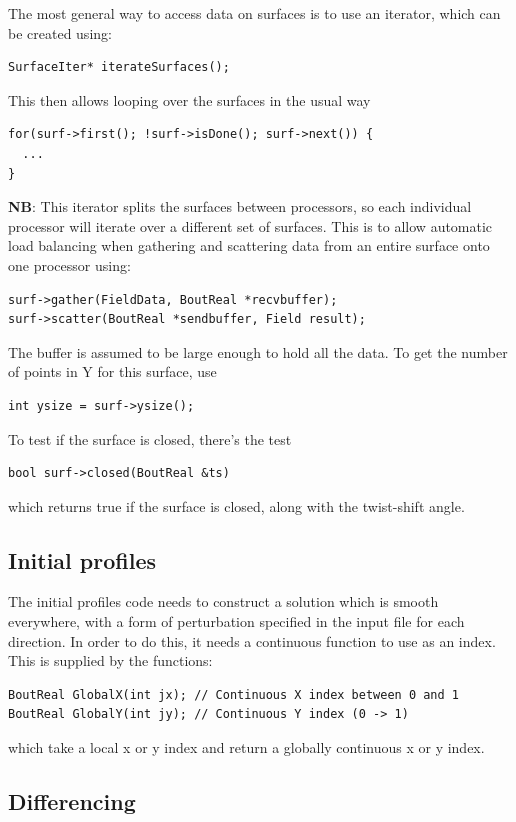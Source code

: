 \documentclass[12pt]{article}
\begin{document}
The most general way to access data on surfaces is to use an
iterator, which can be created using:
\begin{lstlisting}
SurfaceIter* iterateSurfaces();
\end{lstlisting}
This then allows looping over the surfaces in the usual way
\begin{lstlisting}
for(surf->first(); !surf->isDone(); surf->next()) {
  ...
}
\end{lstlisting}
{\bf NB}: This iterator splits the surfaces between processors, so each
individual processor will iterate over a different set of surfaces. This
is to allow automatic load balancing when gathering and scattering data
from an entire surface onto one processor using:
\begin{lstlisting}
surf->gather(FieldData, BoutReal *recvbuffer);
surf->scatter(BoutReal *sendbuffer, Field result);
\end{lstlisting}
The buffer is assumed to be large enough to hold all the data. To 
get the number of points in Y for this surface, use
\begin{lstlisting}
int ysize = surf->ysize();
\end{lstlisting}
To test if the surface is closed, there's the test
\begin{lstlisting}
bool surf->closed(BoutReal &ts)
\end{lstlisting}
which returns true if the surface is closed, along with the twist-shift angle.

\subsection{Initial profiles}
The initial profiles code needs to construct a solution which is smooth
everywhere, with a form of perturbation specified in the input file
for each direction. In order to do this, it needs a continuous function
to use as an index. This is supplied by the functions:
\begin{lstlisting}
BoutReal GlobalX(int jx); // Continuous X index between 0 and 1
BoutReal GlobalY(int jy); // Continuous Y index (0 -> 1)
\end{lstlisting}
which take a local x or y index and return a globally continuous x or y
index.

\subsection{Differencing}
\end{document}
